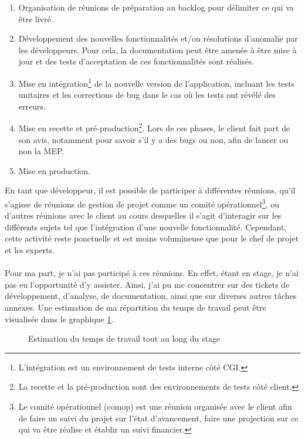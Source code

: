 \documentclass[12pt, a4paper]{report}
\begin{document}
	\begin{enumerate}
		\item Organisation de réunions de préparation au backlog pour délimiter ce qui va être livré.
		\item Développement des nouvelles fonctionnalités et/ou résolutions d'anomalie par les développeurs. Pour cela, la documentation peut être amenée à être mise à jour et des tests d'acceptation de ces fonctionnalités sont réalisés.
		\item Mise en intégration\footnote{L'intégration est un environnement de tests interne côté CGI.} de la nouvelle version de l'application, incluant les tests unitaires et les corrections de bug dans le cas où les tests ont révélé des erreurs.
		\item Mise en recette et pré-production\footnote{La recette et la pré-production sont des environnements de tests côté client.}. Lors de ces phases, le client fait part de son avis, notamment pour savoir s'il y a des bugs ou non, afin de lancer ou non la MEP.
		\item Mise en production.
	\end{enumerate}

	\noindent
	En tant que développeur, il est possible de participer à différentes réunions, qu'il s'agisse de réunions de gestion de projet comme un comité opérationnel\footnote{Le comité opérationnel (comop) est une réunion organisée avec le client afin de faire un suivi du projet sur l'état d'avancement, faire une projection sur ce qui va être réalise et établir un suivi financier.}, ou d'autres réunions avec le client au cours desquelles il s'agit d'interagir sur les différents sujets tel que l'intégration d'une nouvelle fonctionnalité. Cependant, cette activité reste ponctuelle et est moins volumineuse que pour le chef de projet et les experts.
	\\\\
	Pour ma part, je n'ai pas participé à ces réunions. En effet, étant en stage, je n'ai pas eu l'opportunité d'y assister. Ainsi, j'ai pu me concentrer sur des tickets de développement, d'analyse, de documentation, ainsi que sur diverses autres tâches annexes. Une estimation de ma répartition du temps de travail peut être visualisée dans le graphique \ref{fig:temps}.\newline

	\begin{figure}[!h]
		\centering
		\caption{Estimation du temps de travail tout au long du stage}
		\label{fig:temps}
	\end{figure}
\end{document}
